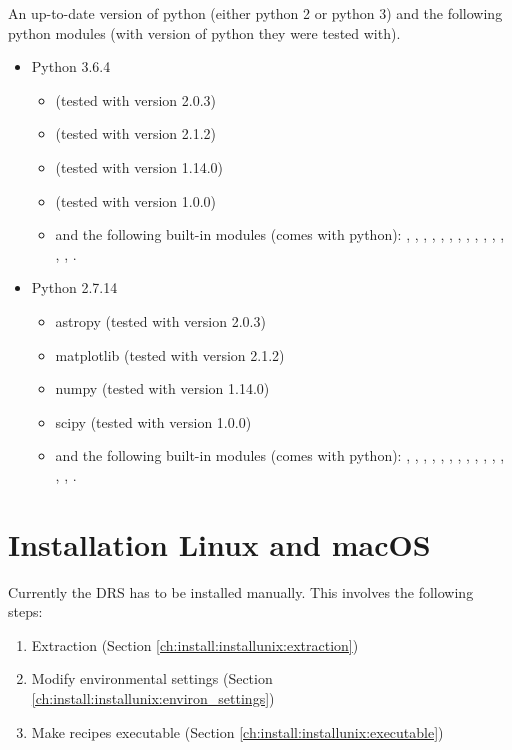 An up-to-date version of python (either python 2 or python 3) and the following python modules (with version of python they were tested with).
\begin{itemize}
\item Python 3.6.4
	\begin{itemize}
	\item {} (tested with version 2.0.3)
	\item {} (tested with version 2.1.2)
	\item {} (tested with version 1.14.0)
	\item {} (tested with version 1.0.0)
	\item and the following built-in modules (comes with python): 
	, , , , , , , , , , , , , , .
	\end{itemize}
\item Python 2.7.14
	\begin{itemize}
	\item astropy (tested with version 2.0.3)
	\item matplotlib (tested with version 2.1.2)
	\item numpy (tested with version 1.14.0)
	\item scipy (tested with version 1.0.0)
	\item and the following built-in modules (comes with python): 
	, , , , , , , , , , , , , , .
	\end{itemize}
\end{itemize}


\clearpage
\newpage
\section{Installation Linux and macOS}
\label{ch:install:installunix}

Currently the DRS has to be installed manually. This involves the following steps:
\begin{enumerate}
\item Extraction (Section \ref{ch:install:installunix:extraction})
\item Modify environmental settings (Section \ref{ch:install:installunix:environ_settings})
\item Make recipes executable (Section \ref{ch:install:installunix:executable})
\end{enumerate}

